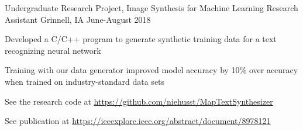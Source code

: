 \documentclass[12pt, a4paper]{awesome-cv}
\begin{document}
\begin{cventries}
  \cventry
    {Undergraduate Research Project, Image Synthesis for Machine Learning}
    {Research Assistant}
    {Grinnell, IA}
    {June-August 2018}
    {
      \begin{cvitems}
        \item{Developed a C/C++ program to generate synthetic training data for a text recognizing neural network}
        \item{Training with our data generator improved model accuracy by 10\% over accuracy when trained on industry-standard data sets}
	      \item{See the research code at \underline{\href{https://github.com/niehusst/MapTextSynthesizer}{https://github.com/niehusst/MapTextSynthesizer}}}
	      \item{See publication at \underline{\href{https://ieeexplore.ieee.org/abstract/document/8978121}{https://ieeexplore.ieee.org/abstract/document/8978121}}}
      \end{cvitems}
    }





\end{cventries}
\end{document}
